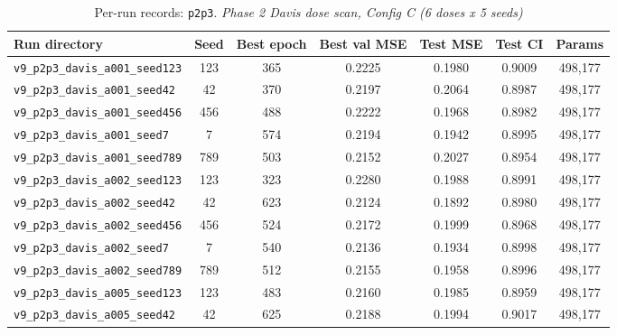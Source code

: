 \begin{table}[!h]
\centering\scriptsize
\caption{Per-run records: \texttt{p2p3}. \textit{Phase 2 Davis dose scan, Config C (6 doses x 5 seeds)}}
\label{tab:v9_runs_p2p3}
\begin{tabular}{p{4.8cm}cccccc}
\toprule
Run directory & Seed & Best epoch & Best val MSE & Test MSE & Test CI & Params \\
\midrule
\texttt{v9\_\allowbreak{}p2p3\_\allowbreak{}davis\_\allowbreak{}a001\_\allowbreak{}seed123} & 123 & 365 & 0.2225 & 0.1980 & 0.9009 & 498,177 \\
\texttt{v9\_\allowbreak{}p2p3\_\allowbreak{}davis\_\allowbreak{}a001\_\allowbreak{}seed42} & 42 & 370 & 0.2197 & 0.2064 & 0.8987 & 498,177 \\
\texttt{v9\_\allowbreak{}p2p3\_\allowbreak{}davis\_\allowbreak{}a001\_\allowbreak{}seed456} & 456 & 488 & 0.2222 & 0.1968 & 0.8982 & 498,177 \\
\texttt{v9\_\allowbreak{}p2p3\_\allowbreak{}davis\_\allowbreak{}a001\_\allowbreak{}seed7} & 7 & 574 & 0.2194 & 0.1942 & 0.8995 & 498,177 \\
\texttt{v9\_\allowbreak{}p2p3\_\allowbreak{}davis\_\allowbreak{}a001\_\allowbreak{}seed789} & 789 & 503 & 0.2152 & 0.2027 & 0.8954 & 498,177 \\
\texttt{v9\_\allowbreak{}p2p3\_\allowbreak{}davis\_\allowbreak{}a002\_\allowbreak{}seed123} & 123 & 323 & 0.2280 & 0.1988 & 0.8991 & 498,177 \\
\texttt{v9\_\allowbreak{}p2p3\_\allowbreak{}davis\_\allowbreak{}a002\_\allowbreak{}seed42} & 42 & 623 & 0.2124 & 0.1892 & 0.8980 & 498,177 \\
\texttt{v9\_\allowbreak{}p2p3\_\allowbreak{}davis\_\allowbreak{}a002\_\allowbreak{}seed456} & 456 & 524 & 0.2172 & 0.1999 & 0.8968 & 498,177 \\
\texttt{v9\_\allowbreak{}p2p3\_\allowbreak{}davis\_\allowbreak{}a002\_\allowbreak{}seed7} & 7 & 540 & 0.2136 & 0.1934 & 0.8998 & 498,177 \\
\texttt{v9\_\allowbreak{}p2p3\_\allowbreak{}davis\_\allowbreak{}a002\_\allowbreak{}seed789} & 789 & 512 & 0.2155 & 0.1958 & 0.8996 & 498,177 \\
\texttt{v9\_\allowbreak{}p2p3\_\allowbreak{}davis\_\allowbreak{}a005\_\allowbreak{}seed123} & 123 & 483 & 0.2160 & 0.1985 & 0.8959 & 498,177 \\
\texttt{v9\_\allowbreak{}p2p3\_\allowbreak{}davis\_\allowbreak{}a005\_\allowbreak{}seed42} & 42 & 625 & 0.2188 & 0.1994 & 0.9017 & 498,177 \\

\end{tabular}
\end{table}
